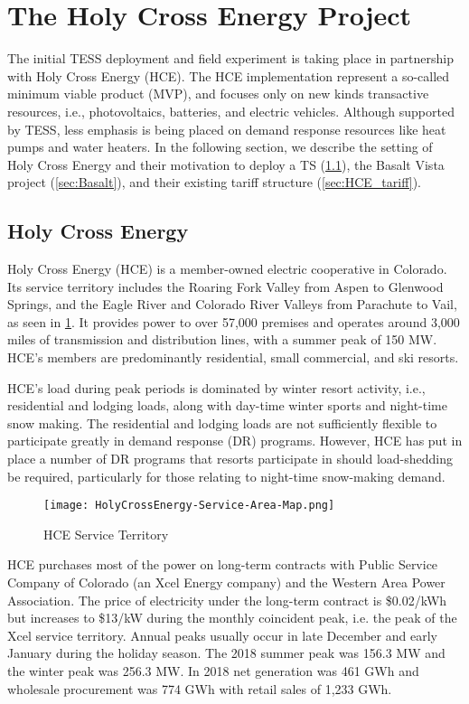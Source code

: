 \section{The Holy Cross Energy Project}\label{sec:hce}

The initial TESS deployment and field experiment is taking place in partnership with Holy Cross Energy (HCE). The HCE implementation represent a so-called minimum viable product (MVP), and focuses only on new kinds transactive resources, i.e., photovoltaics, batteries, and electric vehicles.  Although supported by TESS, less emphasis is being placed on demand response resources like heat pumps and water heaters.  
In the following section, we describe the setting of Holy Cross Energy and their motivation to deploy a TS (\cref{sec:HCE_description}), the Basalt Vista project (\cref{sec:Basalt}), and their existing tariff structure (\cref{sec:HCE_tariff}). 

\subsection{Holy Cross Energy}\label{sec:HCE_description}

Holy Cross Energy (HCE) is a member-owned electric cooperative in Colorado. Its service territory includes the Roaring Fork Valley from Aspen to Glenwood Springs, and the Eagle River and Colorado River Valleys from Parachute to Vail, as seen in \cref{fig:HCE_service_territory}. It provides power to over 57,000 premises and operates around 3,000 miles of transmission and distribution lines, with a summer peak of 150 MW. HCE's members are predominantly residential, small commercial, and ski resorts. 

HCE's load during peak periods is dominated by winter resort activity, i.e., residential and lodging loads, along with day-time winter sports and night-time snow making.  The residential and lodging loads are not sufficiently flexible to participate greatly in demand response (DR) programs. However, HCE has put in place a number of DR programs that resorts participate in should load-shedding be required, particularly for those relating to night-time snow-making demand.

\begin{figure}
\centering
\texttt{[image: HolyCrossEnergy-Service-Area-Map.png]}
\caption{HCE Service Territory}
\label{fig:HCE_service_territory}
\end{figure}

HCE purchases most of the power on long-term contracts with Public Service Company of Colorado (an Xcel Energy company) and the Western Area Power Association. The price of electricity under the long-term contract is \$0.02/kWh but increases to \$13/kW during the monthly coincident peak, i.e. the peak of the Xcel service territory. Annual peaks usually occur in late December and early January during the holiday season. The 2018 summer peak was 156.3 MW and the winter peak was 256.3 MW.  In 2018 net generation was 461 GWh and wholesale procurement was 774 GWh with retail sales of 1,233 GWh.

